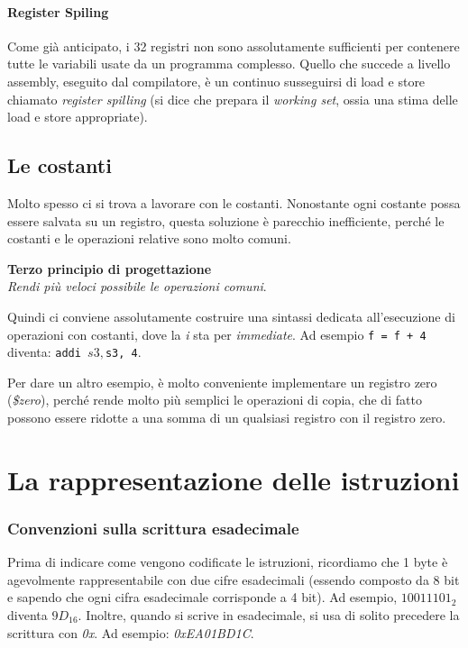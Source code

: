 \documentclass[class=book, crop=false]{standalone}
\begin{document}
\paragraph{Register Spiling}
Come già anticipato, i 32 registri non sono assolutamente sufficienti per contenere tutte le variabili usate da un programma complesso. Quello che succede a livello assembly, eseguito dal compilatore, è un continuo susseguirsi di load e store chiamato \emph{register spilling} (si dice che prepara il \emph{working set}, ossia una stima delle load e store appropriate).

\subsection{Le costanti}
Molto spesso ci si trova a lavorare con le costanti. Nonostante ogni costante possa essere salvata su un registro, questa soluzione è parecchio inefficiente, perché le costanti e le operazioni relative sono molto comuni.

\vspace{8pt}
\begin{tcolorbox}
\centering
\textbf{Terzo principio di progettazione}\\
\emph{Rendi più veloci possibile le operazioni comuni}.
\end{tcolorbox}
\vspace{5pt}

Quindi ci conviene assolutamente costruire una sintassi dedicata all'esecuzione di operazioni con costanti, dove la \emph{i} sta per \emph{immediate}. Ad esempio \texttt{f = f + 4} diventa: \texttt{addi $s3, $s3, 4}.

Per dare un altro esempio, è molto conveniente implementare un registro zero (\emph{\$zero}), perché rende molto più semplici le operazioni di copia, che di fatto possono essere ridotte a una somma di un qualsiasi registro con il registro zero.

\section{La rappresentazione delle istruzioni}

\subsubsection{Convenzioni sulla scrittura esadecimale}
Prima di indicare come vengono codificate le istruzioni, ricordiamo che 1 byte è agevolmente rappresentabile con due cifre esadecimali (essendo composto da 8 bit e sapendo che ogni cifra esadecimale corrisponde a 4 bit). Ad esempio, \(1001 1101_{2}\) diventa \(9D_{16}\). Inoltre, quando si scrive in esadecimale, si usa di solito precedere la scrittura con \emph{0x}. Ad esempio: \emph{0xEA01BD1C}.
\end{document}
